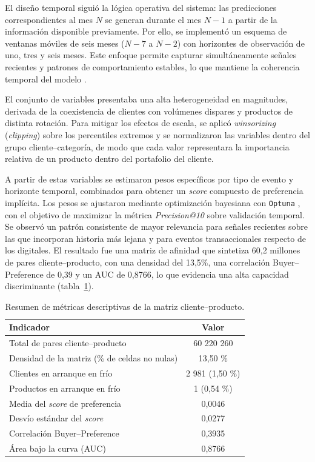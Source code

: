 El diseño temporal siguió la lógica operativa del sistema: las predicciones correspondientes al mes $N$ se generan durante el mes $N-1$ a partir de la información disponible previamente. Por ello, se implementó un esquema de ventanas móviles de seis meses ($N-7$ a $N-2$) con horizontes de observación de uno, tres y seis meses. Este enfoque permite capturar simultáneamente señales recientes y patrones de comportamiento estables, lo que mantiene la coherencia temporal del modelo \cite{ARTICLE:Koren2010,BOOK:Aggarwal2016}.

El conjunto de variables presentaba una alta heterogeneidad en magnitudes, derivada de la coexistencia de clientes con volúmenes dispares y productos de distinta rotación. Para mitigar los efectos de escala, se aplicó \textit{winsorizing} (\textit{clipping}) sobre los percentiles extremos \cite{BOOK:Aggarwal2015} y se normalizaron las variables dentro del grupo cliente–categoría, de modo que cada valor representara la importancia relativa de un producto dentro del portafolio del cliente. 

A partir de estas variables se estimaron pesos específicos por tipo de evento y horizonte temporal, combinados para obtener un \textit{score} compuesto de preferencia implícita. Los pesos se ajustaron mediante optimización bayesiana con \texttt{Optuna} \cite{ARTICLE:Akiba2019}, con el objetivo de maximizar la métrica \textit{Precision@10} sobre validación temporal. Se observó un patrón consistente de mayor relevancia para señales recientes sobre las que incorporan historia más lejana y para eventos transaccionales respecto de los digitales. El resultado fue una matriz de afinidad que sintetiza 60,2 millones de pares cliente–producto, con una densidad del 13,5\%, una correlación Buyer–Preference de 0,39 y un AUC de 0,8766, lo que evidencia una alta capacidad discriminante (tabla~\ref{tab:metricas_matriz}).

\begin{table}[H]
	\centering
	\caption[Métricas descriptivas de la matriz cliente–producto]{Resumen de métricas descriptivas de la matriz cliente–producto.}
	\begin{tabular}{l c}    
		\toprule
		\textbf{Indicador}     & \textbf{Valor}\\
		\midrule
		Total de pares cliente–producto & 60 220 260 \\
		Densidad de la matriz (\% de celdas no nulas) & 13{,}50 \% \\
		Clientes en arranque en frío & 2 981 (1{,}50 \%) \\
		Productos en arranque en frío & 1 (0{,}54 \%) \\
		Media del \textit{score} de preferencia & 0{,}0046 \\
		Desvío estándar del \textit{score} & 0{,}0277 \\
		Correlación Buyer–Preference & 0{,}3935 \\
		Área bajo la curva (AUC) & 0{,}8766 \\
		\bottomrule
	\end{tabular}
	\label{tab:metricas_matriz}
\end{table}

